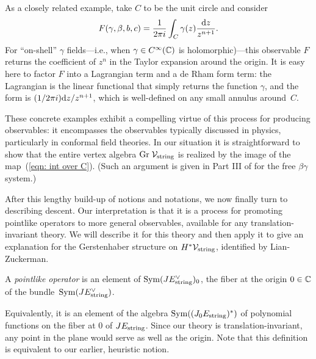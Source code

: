 As a closely related example, take $C$ to be the unit circle and consider
\[
F(\gamma,\beta,b,c) = \frac{1}{2\pi i}\int_C \gamma(z) \frac{{\rm d} z}{z^{n+1}}.
\]
For ``on-shell'' $\gamma$ fields---i.e., when $\gamma \in C^\infty(\mathbb C)$ is holomorphic)---this observable $F$ returns the coefficient of $z^n$ in the Taylor expansion around the origin.
It is easy here to factor $F$ into a Lagrangian term and a de Rham form term: 
the Lagrangian is the linear functional that simply returns the function $\gamma$, 
and the form is $(1/2\pi i){\rm d} z/z^{n+1}$, which is well-defined on any small annulus around~$C$.

These concrete examples exhibit a compelling virtue of this process for producing observables: 
it encompasses the observables typically discussed in physics, 
particularly in conformal field theories.
In our situation it is straightforward to show that the entire vertex algebra ${\rm Gr}\; \mathcal{V}_{\rm string}$ is realized by the image of the map~(\ref{eqn: int over C}).
(Such an argument is given in Part III of \cite{GGW} for the free $\beta\gamma$ system.)

After this lengthy build-up of notions and notations, 
we now finally turn to describing descent.
Our interpretation is that it is a process for promoting pointlike operators to more general observables,
available for any translation-invariant theory.
We will describe it for this theory and then apply it to give an explanation for the Gerstenhaber structure on $H^* \mathcal{V}_{\rm string}$,
identified by Lian-Zuckerman.

\begin{dfn}
A {\em pointlike operator} is an element of ${\rm Sym}(J E_{\rm string}^\vee)_0$, 
the fiber at the origin $0 \in \mathbb C$ of the bundle~${\rm Sym}(J E_{\rm string}^\vee)$.
\end{dfn}

Equivalently, it is an element of the algebra ${\rm Sym}((J_0E_{\rm string})^*)$ of polynomial functions on the fiber at $0$ of $J E_{\rm string}$.
Since our theory is translation-invariant, 
any point in the plane would serve as well as the origin.
Note that this definition is equivalent to our earlier, heuristic notion.

